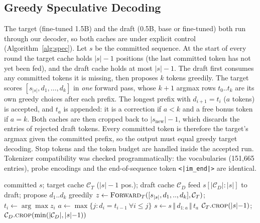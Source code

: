 \documentclass[conference]{IEEEtran}
\begin{document}
\subsection{Greedy Speculative Decoding}\label{sec:spec}
The target (fine-tuned 1.5B) and the draft (0.5B, base or fine-tuned) both run through our decoder, so both caches are under explicit control (Algorithm~\ref{alg:spec}). Let $s$ be the committed sequence. At the start of every round the target cache holds $|s|{-}1$ positions (the last committed token has not yet been fed), and the draft cache holds at most $|s|{-}1$. The draft first consumes any committed tokens it is missing, then proposes $k$ tokens greedily. The target scores $[s_{|s|}, d_1,\ldots,d_k]$ in \emph{one} forward pass, whose $k{+}1$ argmax rows $t_0..t_k$ are its own greedy choices after each prefix. The longest prefix with $d_{i+1}=t_i$ ($a$ tokens) is accepted, and $t_a$ is appended: it is a correction if $a<k$ and a free bonus token if $a=k$. Both caches are then cropped back to $|s_{\text{new}}|{-}1$, which discards the entries of rejected draft tokens. Every committed token is therefore the target's argmax given the committed prefix, so the output must equal greedy target decoding. Stop tokens and the token budget are handled inside the accepted run. Tokenizer compatibility was checked programmatically: the vocabularies (151{,}665 entries), probe encodings and the end-of-sequence token \texttt{<|im\_end|>} are identical.

\begin{algorithm}[t]
\caption{One round of greedy speculative decoding}\label{alg:spec}
\begin{algorithmic}[1]
\Require committed $s$; target cache $\mathcal{C}_T$ ($|s|{-}1$ pos.); draft cache $\mathcal{C}_D$
\State feed $s[|\mathcal{C}_D|{:}|s|]$ to draft; propose $d_1..d_k$ greedily
\State $z\gets\textsc{Forward}_T([s_{|s|},d_1,..,d_k],\mathcal{C}_T)$;\; $t_i\gets\arg\max z_i$
\State $a\gets\max\{j: d_i=t_{i-1}\ \forall i\le j\}$
\State $s\gets s\,\Vert\,d_{1:a}\,\Vert\,t_a$ 
\State $\mathcal{C}_T.\textsc{crop}(|s|{-}1)$;\; $\mathcal{C}_D.\textsc{crop}(\min(|\mathcal{C}_D|,|s|{-}1))$
\end{algorithmic}
\end{algorithm}
\end{document}
